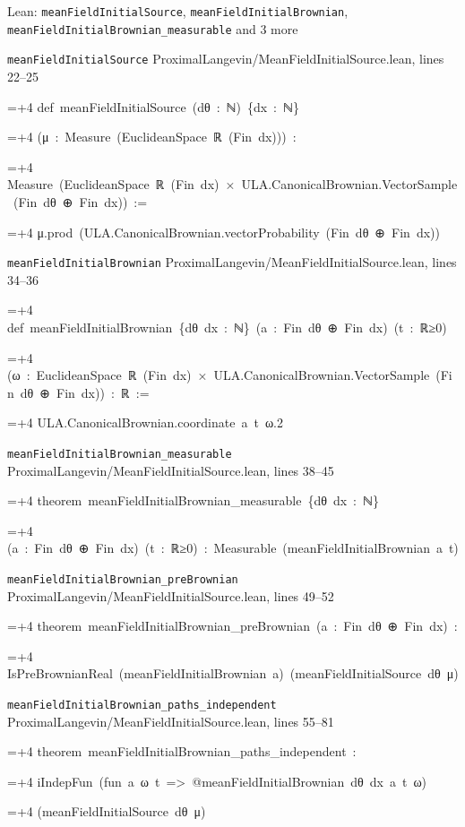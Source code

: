 \documentclass[11pt,a4paper]{article}
\newlength{\leancharwidth}
\newenvironment{leancode}{\par\smallskip\begingroup\ttfamily\footnotesize\raggedright
  \settowidth{\leancharwidth}{M}\setlength{\parskip}{0pt}\setlength{\parindent}{0pt}
  \frenchspacing}{\par\endgroup\smallskip}
\newcommand{\leanline}[2]{\hangindent=\dimexpr#1\leancharwidth+4\leancharwidth\relax
  \hangafter=1\noindent\hspace*{#1\leancharwidth}#2\par}
\newcommand{\leansource}[1]{\par{\footnotesize\color{leanmuted}#1}\par}
\begin{document}
\begin{leanbox}{Lean: \texttt{meanFieldInitialSource}, \texttt{meanFieldInitialBrownian}, \texttt{meanFieldInitialBrownian\_\allowbreak{}measurable} and 3 more}
\leansource{\texttt{meanFieldInitialSource} \quad ProximalLangevin/\allowbreak{}MeanFieldInitialSource.lean, lines 22–25}
\begin{leancode}
\leanline{0}{def\ meanFieldInitialSource\ (dθ\ :\ ℕ)\ \{dx\ :\ ℕ\}}
\leanline{4}{(μ\ :\ Measure\ (EuclideanSpace\ ℝ\ (Fin\ dx)))\ :}
\leanline{4}{Measure\ (EuclideanSpace\ ℝ\ (Fin\ dx)\ ×\ ULA.CanonicalBrownian.VectorSample\ (Fin\ dθ\ ⊕\ Fin\ dx))\ :=}
\leanline{2}{μ.prod\ (ULA.CanonicalBrownian.vectorProbability\ (Fin\ dθ\ ⊕\ Fin\ dx))}
\end{leancode}
\leansource{\texttt{meanFieldInitialBrownian} \quad ProximalLangevin/\allowbreak{}MeanFieldInitialSource.lean, lines 34–36}
\begin{leancode}
\leanline{0}{def\ meanFieldInitialBrownian\ \{dθ\ dx\ :\ ℕ\}\ (a\ :\ Fin\ dθ\ ⊕\ Fin\ dx)\ (t\ :\ ℝ≥0)}
\leanline{4}{(ω\ :\ EuclideanSpace\ ℝ\ (Fin\ dx)\ ×\ ULA.CanonicalBrownian.VectorSample\ (Fin\ dθ\ ⊕\ Fin\ dx))\ :\ ℝ\ :=}
\leanline{2}{ULA.CanonicalBrownian.coordinate\ a\ t\ ω.2}
\end{leancode}
\leansource{\texttt{meanFieldInitialBrownian\_\allowbreak{}measurable} \quad ProximalLangevin/\allowbreak{}MeanFieldInitialSource.lean, lines 38–45}
\begin{leancode}
\leanline{0}{theorem\ meanFieldInitialBrownian\_measurable\ \{dθ\ dx\ :\ ℕ\}}
\leanline{4}{(a\ :\ Fin\ dθ\ ⊕\ Fin\ dx)\ (t\ :\ ℝ≥0)\ :\ Measurable\ (meanFieldInitialBrownian\ a\ t)}
\end{leancode}
\leansource{\texttt{meanFieldInitialBrownian\_\allowbreak{}preBrownian} \quad ProximalLangevin/\allowbreak{}MeanFieldInitialSource.lean, lines 49–52}
\begin{leancode}
\leanline{0}{theorem\ meanFieldInitialBrownian\_preBrownian\ (a\ :\ Fin\ dθ\ ⊕\ Fin\ dx)\ :}
\leanline{4}{IsPreBrownianReal\ (meanFieldInitialBrownian\ a)\ (meanFieldInitialSource\ dθ\ μ)}
\end{leancode}
\leansource{\texttt{meanFieldInitialBrownian\_\allowbreak{}paths\_\allowbreak{}independent} \quad ProximalLangevin/\allowbreak{}MeanFieldInitialSource.lean, lines 55–81}
\begin{leancode}
\leanline{0}{theorem\ meanFieldInitialBrownian\_paths\_independent\ :}
\leanline{4}{iIndepFun\ (fun\ a\ ω\ t\ =>\ @meanFieldInitialBrownian\ dθ\ dx\ a\ t\ ω)}
\leanline{6}{(meanFieldInitialSource\ dθ\ μ)}

\end{leancode}
\end{leanbox}
\end{document}
